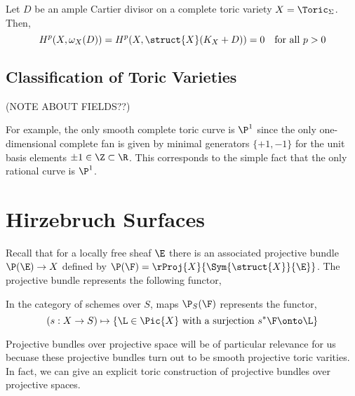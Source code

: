 \documentclass[12pt]{article}
\begin{document}
\begin{theorem}
Let $D$ be an ample Cartier divisor on a complete toric variety $X = \Toric_\Sigma$. Then,
\[ H^p(X, \omega_X(D)) = H^p(X, \struct{X}(K_X + D)) = 0 \quad \text{for all } p > 0 \]
\end{theorem}


\subsection{Classification of Toric Varieties}

(NOTE ABOUT FIELDS??)

\begin{rmk}
For example, the only smooth complete toric curve is $\P^1$ since the only one-dimensional complete fan is given by minimal generators $\{ +1 , -1 \}$ for the unit basis elements $\pm 1 \in \Z \subset \R$. This corresponds to the simple fact that the only rational curve is $\P^1$. 
\end{rmk}

\section{Hirzebruch Surfaces}

Recall that for a locally free sheaf $\E$ there is an associated projective bundle $\P(\E) \to X$ defined by $\P(\F) = \rProj{X}{\Sym{\struct{X}}{\E}}$. The projective bundle represents the following functor,

\begin{prop}
In the category of schemes over $S$, maps $\P_S(\F)$ represents the functor,
\[ (s : X \to S) \mapsto \{ \L \in \Pic{X} \text{ with a surjection } s^* \F \onto \L \} \] 
\end{prop}

Projective bundles over projective space will be of particular relevance for us becuase these projective bundles turn out to be smooth projective toric varities. In fact, we can give an explicit toric construction of projective bundles over projective spaces.
\end{document}
